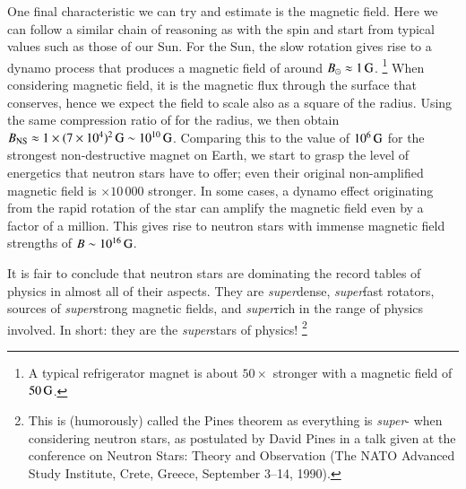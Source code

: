 One final characteristic we can try and estimate is the magnetic field.
Here we can follow a similar chain of reasoning as with the spin and start from typical values such as those of our Sun.
For the Sun, the slow rotation gives rise to a dynamo process that produces a magnetic field of around $B_{\odot} \approx 1\, \mathrm{G}$.%
\footnote{A typical refrigerator magnet is about $50\times$ stronger with a magnetic field of $50\, \mathrm{G}$.}
When considering magnetic field, it is the magnetic flux through the surface that conserves, hence we expect the field to scale also as a square of the radius.
Using the same compression ratio of  for the radius, we then obtain $B_{\mathrm{NS}} \approx 1 \times (7 \times 10^{4})^2 \, \mathrm{G} \sim 10^{10} \, \mathrm{G}$.
Comparing this to the value of $10^6\, \mathrm{G}$ for the strongest non-destructive magnet on Earth, we start to grasp the level of energetics that neutron stars have to offer; even their original non-amplified magnetic field is $\times 10\,000$ stronger.
In some cases, a dynamo effect originating from the rapid rotation of the star can amplify the magnetic field even by a factor of a million. 
This gives rise to neutron stars with immense magnetic field strengths of $B \sim 10^{16} \, \mathrm{G}$.

It is fair to conclude that neutron stars are dominating the record tables of physics in almost all of their aspects.
They are \emph{super}dense, \emph{super}fast rotators, sources of \emph{super}strong magnetic fields, and \emph{super}rich in the range of physics involved.
In short: they are the \emph{super}stars of physics!%
\footnote{
    This is (humorously) called the Pines theorem as everything is \emph{super}- when considering neutron stars, as postulated by David Pines in a talk given at the conference on Neutron Stars: Theory and Observation (The NATO Advanced Study Institute, Crete, Greece, September 3–14, 1990).
}
